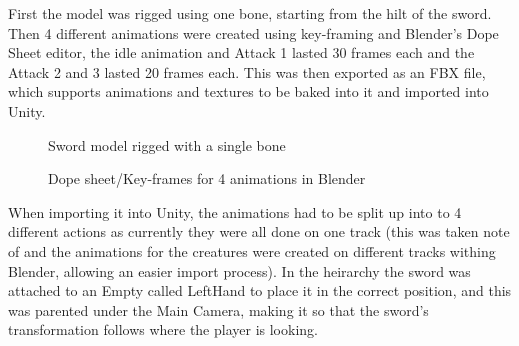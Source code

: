 \documentclass[12pt]{report}
\begin{document}
First the model was rigged using one bone, starting from the hilt of the sword. Then 4 different animations were created using key-framing and Blender's Dope Sheet editor, the idle animation and Attack 1 lasted 30 frames each and the Attack 2 and 3 lasted 20 frames each. This was then exported as an FBX file, which supports animations and textures to be baked into it and imported into Unity.
\begin{figure}[H]
    \begin{minipage}{.2\textwidth}
        \centering
        \caption{Sword model rigged with a single bone}
    \end{minipage}
    \begin{minipage}{.8\textwidth}
        \centering
        \caption{Dope sheet/Key-frames for 4 animations in Blender}
    \end{minipage}
\end{figure}

When importing it into Unity, the animations had to be split up into to 4 different actions as currently they were all done on one track (this was taken note of and the animations for the creatures were created on different tracks withing Blender, allowing an easier import process). In the heirarchy the sword was attached to an Empty called LeftHand to place it in the correct position, and this was parented under the Main Camera, making it so that the sword's transformation follows where the player is looking.
\end{document}
